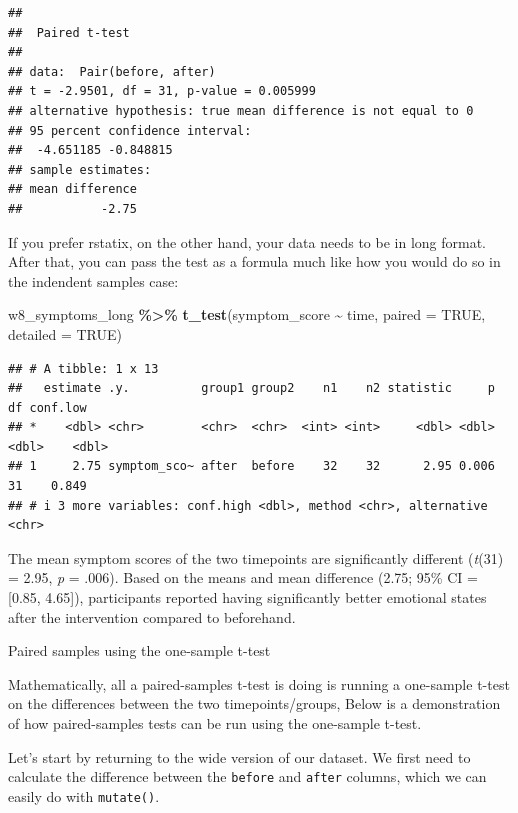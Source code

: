 \documentclass[
]{book}
\newenvironment{Shaded}{\begin{snugshade}}{\end{snugshade}}
\newcommand{\AttributeTok}[1]{\textcolor[rgb]{0.13,0.29,0.53}{#1}}
\newcommand{\ConstantTok}[1]{\textcolor[rgb]{0.56,0.35,0.01}{#1}}
\newcommand{\FunctionTok}[1]{\textcolor[rgb]{0.13,0.29,0.53}{\textbf{#1}}}
\newcommand{\NormalTok}[1]{#1}
\newcommand{\SpecialCharTok}[1]{\textcolor[rgb]{0.81,0.36,0.00}{\textbf{#1}}}
\begin{document}
\begin{verbatim}
## 
##  Paired t-test
## 
## data:  Pair(before, after)
## t = -2.9501, df = 31, p-value = 0.005999
## alternative hypothesis: true mean difference is not equal to 0
## 95 percent confidence interval:
##  -4.651185 -0.848815
## sample estimates:
## mean difference 
##           -2.75
\end{verbatim}

If you prefer rstatix, on the other hand, your data needs to be in long format. After that, you can pass the test as a formula much like how you would do so in the indendent samples case:

\begin{Shaded}
\begin{Highlighting}[]
\NormalTok{w8\_symptoms\_long }\SpecialCharTok{\%\textgreater{}\%}
  \FunctionTok{t\_test}\NormalTok{(symptom\_score }\SpecialCharTok{\textasciitilde{}}\NormalTok{ time, }\AttributeTok{paired =} \ConstantTok{TRUE}\NormalTok{, }\AttributeTok{detailed =} \ConstantTok{TRUE}\NormalTok{)}
\end{Highlighting}
\end{Shaded}

\begin{verbatim}
## # A tibble: 1 x 13
##   estimate .y.          group1 group2    n1    n2 statistic     p    df conf.low
## *    <dbl> <chr>        <chr>  <chr>  <int> <int>     <dbl> <dbl> <dbl>    <dbl>
## 1     2.75 symptom_sco~ after  before    32    32      2.95 0.006    31    0.849
## # i 3 more variables: conf.high <dbl>, method <chr>, alternative <chr>
\end{verbatim}

The mean symptom scores of the two timepoints are significantly different (\emph{t}(31) = 2.95, \emph{p} = .006). Based on the means and mean difference (2.75; 95\% CI = {[}0.85, 4.65{]}), participants reported having significantly better emotional states after the intervention compared to beforehand.

Paired samples using the one-sample t-test

Mathematically, all a paired-samples t-test is doing is running a one-sample t-test on the differences between the two timepoints/groups, Below is a demonstration of how paired-samples tests can be run using the one-sample t-test.

Let's start by returning to the wide version of our dataset. We first need to calculate the difference between the \texttt{before} and \texttt{after} columns, which we can easily do with \texttt{mutate()}.
\end{document}

